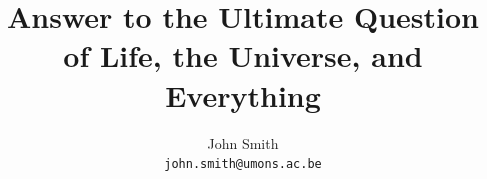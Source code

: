 \documentclass[umonspaper,hyperpdf,twoside,bind,sftitles]{hepthesis}
\title{Answer to the Ultimate Question of Life, the Universe, and Everything}
\author{John Smith \\ {\small\texttt{john.smith@umons.ac.be}} \\[4em]  \displaydate{public}}
\begin{document}
\dominitoc

\begin{frontmatter}	
 
\end{frontmatter}


\begin{mainmatter}
 
\end{mainmatter}

\begin{appendix}
\renewcommand\chaptername{Appendix}

\end{appendix}

\begin{backmatter}
 
\end{backmatter}
\end{document}

